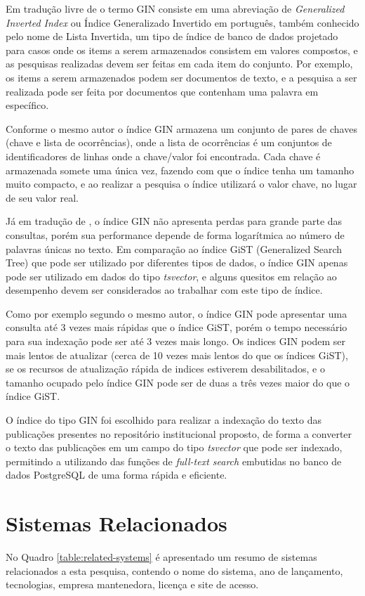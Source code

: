 Em tradução livre de \cite{2022:PostgreSQL} o termo GIN consiste em uma
abreviação de \emph{Generalized Inverted Index} ou Índice Generalizado Invertido em
português, também conhecido pelo nome de Lista Invertida, um tipo de índice de banco
de dados projetado para casos onde os items a serem armazenados consistem em valores
compostos, e as pesquisas realizadas devem ser feitas em cada item do conjunto.
Por exemplo, os items a serem armazenados podem ser documentos de texto, e a pesquisa
a ser realizada pode ser feita por documentos que contenham uma palavra em específico.

Conforme o mesmo autor o índice GIN armazena um conjunto de pares de chaves (chave e lista
de ocorrências), onde a lista de ocorrências é um conjuntos de identificadores de linhas
onde a chave/valor foi encontrada. Cada chave é armazenada somete uma única vez,
fazendo com que o índice tenha um tamanho muito compacto, e ao realizar a pesquisa
o índice utilizará o valor chave, no lugar de seu valor real.

Já em tradução de \cite{2011:PostgreSQL}, o índice GIN não apresenta perdas para
grande parte das consultas, porém sua performance depende de forma logarítmica ao
número de palavras únicas no texto. Em comparação ao índice GiST (Generalized Search Tree)
que pode ser utilizado por diferentes tipos de dados, o índice GIN apenas pode ser utilizado
em dados do tipo \emph{tsvector}, e alguns quesitos em relação ao desempenho devem ser considerados
ao trabalhar com este tipo de índice.

Como por exemplo segundo o mesmo autor, o índice GIN pode apresentar uma consulta
até 3 vezes mais rápidas que o índice GiST, porém o tempo necessário para sua indexação
pode ser até 3 vezes mais longo. Os indices GIN podem ser mais lentos
de atualizar (cerca de 10 vezes mais lentos do que os índices GiST), se os recursos de
atualização rápida de indices estiverem desabilitados, e o tamanho ocupado pelo índice
GIN pode ser de duas a três vezes maior do que o índice GiST.

O índice do tipo GIN foi escolhido para realizar a indexação do texto das publicações
presentes no repositório institucional proposto, de forma a converter o texto das
publicações em um campo do tipo \emph{tsvector} que pode ser indexado, permitindo
a utilizando das funções de \emph{full-text search} embutidas no banco de dados PostgreSQL
de uma forma rápida e eficiente.

\section{Sistemas Relacionados}\label{sec:rs}
No Quadro \ref{table:related-systems} é apresentado um resumo de sistemas relacionados
a esta pesquisa, contendo o nome do sistema, ano de lançamento, tecnologias,
empresa mantenedora, licença e site de acesso.

